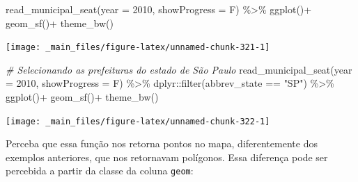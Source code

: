 \documentclass[
  brazilian,
]{book}
\newenvironment{Shaded}{\begin{snugshade}}{\end{snugshade}}
\newcommand{\AttributeTok}[1]{\textcolor[rgb]{0.77,0.63,0.00}{#1}}
\newcommand{\CommentTok}[1]{\textcolor[rgb]{0.56,0.35,0.01}{\textit{#1}}}
\newcommand{\DecValTok}[1]{\textcolor[rgb]{0.00,0.00,0.81}{#1}}
\newcommand{\FunctionTok}[1]{\textcolor[rgb]{0.00,0.00,0.00}{#1}}
\newcommand{\NormalTok}[1]{#1}
\newcommand{\OtherTok}[1]{\textcolor[rgb]{0.56,0.35,0.01}{#1}}
\newcommand{\SpecialCharTok}[1]{\textcolor[rgb]{0.00,0.00,0.00}{#1}}
\newcommand{\StringTok}[1]{\textcolor[rgb]{0.31,0.60,0.02}{#1}}
\begin{document}
\begin{Shaded}
\begin{Highlighting}[]
\FunctionTok{read\_municipal\_seat}\NormalTok{(}\AttributeTok{year =} \DecValTok{2010}\NormalTok{,}
                    \AttributeTok{showProgress =}\NormalTok{ F) }\SpecialCharTok{\%\textgreater{}\%}
  \FunctionTok{ggplot}\NormalTok{()}\SpecialCharTok{+}
  \FunctionTok{geom\_sf}\NormalTok{()}\SpecialCharTok{+}
  \FunctionTok{theme\_bw}\NormalTok{()}
\end{Highlighting}
\end{Shaded}

\begin{center}\texttt{[image: \_main\_files/figure-latex/unnamed-chunk-321-1]} \end{center}

\begin{Shaded}
\begin{Highlighting}[]
\CommentTok{\# Selecionando as prefeituras do estado de São Paulo}
\FunctionTok{read\_municipal\_seat}\NormalTok{(}\AttributeTok{year =} \DecValTok{2010}\NormalTok{,}
                    \AttributeTok{showProgress =}\NormalTok{ F) }\SpecialCharTok{\%\textgreater{}\%} 
\NormalTok{  dplyr}\SpecialCharTok{::}\FunctionTok{filter}\NormalTok{(abbrev\_state }\SpecialCharTok{==} \StringTok{"SP"}\NormalTok{) }\SpecialCharTok{\%\textgreater{}\%} 
  \FunctionTok{ggplot}\NormalTok{()}\SpecialCharTok{+}
  \FunctionTok{geom\_sf}\NormalTok{()}\SpecialCharTok{+}
  \FunctionTok{theme\_bw}\NormalTok{()}
\end{Highlighting}
\end{Shaded}

\begin{center}\texttt{[image: \_main\_files/figure-latex/unnamed-chunk-322-1]} \end{center}

Perceba que essa função nos retorna pontos no mapa, diferentemente dos exemplos anteriores, que nos retornavam polígonos. Essa diferença pode ser percebida a partir da classe da coluna \texttt{geom}:

\begin{Shaded}
\end{Shaded}
\end{document}
